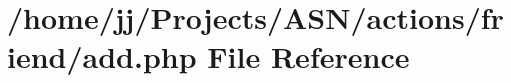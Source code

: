 \hypertarget{actions_2friend_2add_8php}{}\section{/home/jj/\+Projects/\+A\+S\+N/actions/friend/add.php File Reference}
\label{actions_2friend_2add_8php}
